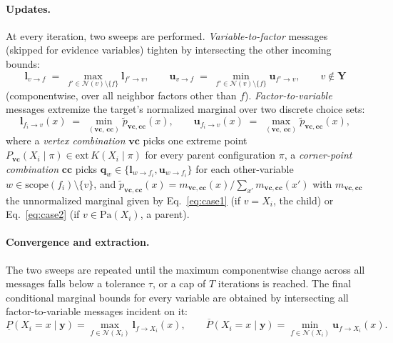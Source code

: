 \documentclass[11pt]{article}
\begin{document}
\paragraph{Updates.}
At every iteration, two sweeps are performed. \emph{Variable-to-factor} messages
(skipped for evidence variables) tighten by intersecting the other incoming
bounds:
\begin{equation}\label{eq:compact-vtof}
  \mathbf{l}_{v \to f} \;=\; \max_{f' \in \mathcal{N}(v) \setminus \{f\}}
                              \mathbf{l}_{f' \to v},
  \qquad
  \mathbf{u}_{v \to f} \;=\; \min_{f' \in \mathcal{N}(v) \setminus \{f\}}
                              \mathbf{u}_{f' \to v}, \qquad v \notin \mathbf{Y}
\end{equation}
(componentwise, over all neighbor factors other than $f$). \emph{Factor-to-variable}
messages extremize the target's normalized marginal over two discrete choice
sets:
\begin{equation}\label{eq:compact-ftov}
  \mathbf{l}_{f_i \to v}(x) \;=\; \min_{(\mathbf{vc},\,\mathbf{cc})}
    \tilde{p}_{\mathbf{vc},\mathbf{cc}}(x),
  \qquad
  \mathbf{u}_{f_i \to v}(x) \;=\; \max_{(\mathbf{vc},\,\mathbf{cc})}
    \tilde{p}_{\mathbf{vc},\mathbf{cc}}(x),
\end{equation}
where a \emph{vertex combination} $\mathbf{vc}$ picks one extreme point
$P_{\mathbf{vc}}(X_i \mid \pi) \in \mathrm{ext}\,K(X_i \mid \pi)$ for every
parent configuration $\pi$, a \emph{corner-point combination} $\mathbf{cc}$
picks $\mathbf{q}_w \in \{\mathbf{l}_{w \to f_i}, \mathbf{u}_{w \to f_i}\}$ for
each other-variable $w \in \mathrm{scope}(f_i) \setminus \{v\}$, and
$\tilde{p}_{\mathbf{vc},\mathbf{cc}}(x) = m_{\mathbf{vc},\mathbf{cc}}(x) /
\sum_{x'} m_{\mathbf{vc},\mathbf{cc}}(x')$ with $m_{\mathbf{vc},\mathbf{cc}}$
the unnormalized marginal given by Eq.~\ref{eq:case1} (if $v = X_i$, the child)
or Eq.~\ref{eq:case2} (if $v \in \mathrm{Pa}(X_i)$, a parent).

\paragraph{Convergence and extraction.}
The two sweeps are repeated until the maximum componentwise change across all
messages falls below a tolerance $\tau$, or a cap of $T$ iterations is reached.
The final conditional marginal bounds for every variable are obtained by
intersecting all factor-to-variable messages incident on it:
\begin{equation}\label{eq:compact-extract}
  \underline{P}(X_i{=}x \mid \mathbf{y}) = \max_{f \in \mathcal{N}(X_i)}
    \mathbf{l}_{f \to X_i}(x),
  \qquad
  \overline{P}(X_i{=}x \mid \mathbf{y}) = \min_{f \in \mathcal{N}(X_i)}
    \mathbf{u}_{f \to X_i}(x).
\end{equation}
\end{document}
